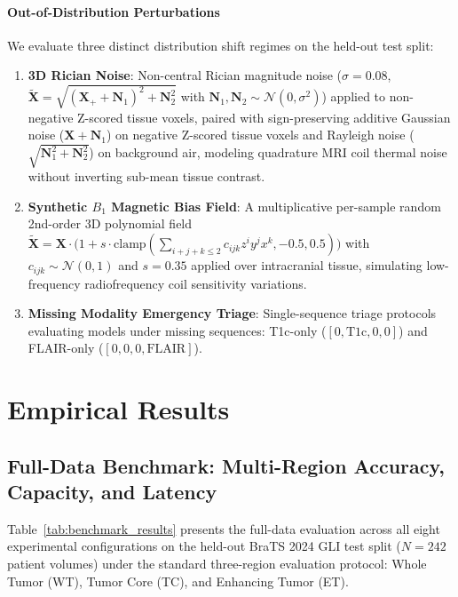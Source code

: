 \documentclass{article}
\begin{document}
\paragraph{Out-of-Distribution Perturbations}
We evaluate three distinct distribution shift regimes on the held-out test split:
\begin{enumerate}
    \item \textbf{3D Rician Noise}: Non-central Rician magnitude noise ($\sigma = 0.08$, $\tilde{\mathbf{X}} = \sqrt{(\mathbf{X}_+ + \mathbf{N}_1)^2 + \mathbf{N}_2^2}$ with $\mathbf{N}_1, \mathbf{N}_2 \sim \mathcal{N}(0, \sigma^2)$) applied to non-negative Z-scored tissue voxels, paired with sign-preserving additive Gaussian noise ($\mathbf{X} + \mathbf{N}_1$) on negative Z-scored tissue voxels and Rayleigh noise ($\sqrt{\mathbf{N}_1^2 + \mathbf{N}_2^2}$) on background air, modeling quadrature MRI coil thermal noise without inverting sub-mean tissue contrast.
    \item \textbf{Synthetic $B_1$ Magnetic Bias Field}: A multiplicative per-sample random 2nd-order 3D polynomial field $\tilde{\mathbf{X}} = \mathbf{X} \cdot \big(1 + s \cdot \text{clamp}(\sum_{i+j+k \le 2} c_{ijk} z^i y^j x^k, -0.5, 0.5)\big)$ with $c_{ijk} \sim \mathcal{N}(0, 1)$ and $s = 0.35$ applied over intracranial tissue, simulating low-frequency radiofrequency coil sensitivity variations.
    \item \textbf{Missing Modality Emergency Triage}: Single-sequence triage protocols evaluating models under missing sequences: T1c-only ($[0, \text{T1c}, 0, 0]$) and FLAIR-only ($[0, 0, 0, \text{FLAIR}]$).
\end{enumerate}


\section{Empirical Results}
\label{sec:results}

\subsection{Full-Data Benchmark: Multi-Region Accuracy, Capacity, and Latency}
\label{sec:results_full_data}

Table~\ref{tab:benchmark_results} presents the full-data evaluation across all eight experimental configurations on the held-out BraTS 2024 GLI test split ($N=242$ patient volumes) under the standard three-region evaluation protocol: Whole Tumor (WT), Tumor Core (TC), and Enhancing Tumor (ET).
\end{document}
